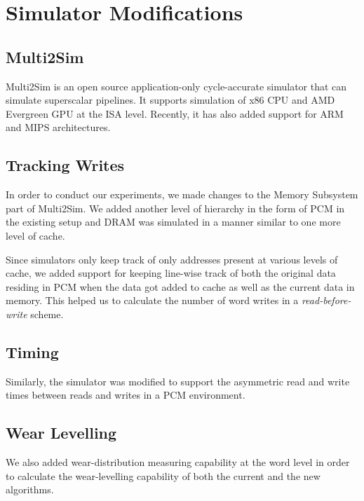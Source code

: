 \chapter{Simulator Modifications}
\label{sim}

\section{Multi2Sim}

Multi2Sim is an open source application-only cycle-accurate simulator that can simulate superscalar pipelines. It supports simulation of x86 CPU and AMD Evergreen GPU at the ISA level. Recently, it has also added support for ARM and MIPS architectures.


\section{Tracking Writes}
In order to conduct our experiments, we made changes to the Memory Subsystem part of Multi2Sim. We added another level of hierarchy in the form of PCM in the existing setup and DRAM was simulated in a manner similar to one more level of cache.

Since simulators only keep track of only addresses present at various levels of cache, we added support for keeping line-wise track of both the original data residing in PCM when the data got added to cache as well as the current data in memory. This helped us to calculate the number of word writes in a \textit{read-before-write} scheme.
 

\section{Timing}
Similarly, the simulator was modified to support the asymmetric read and write times between reads and writes in a PCM environment.

\section{Wear Levelling}
We also added wear-distribution measuring capability at the word level in order to calculate the wear-levelling capability of both the current and the new algorithms.


